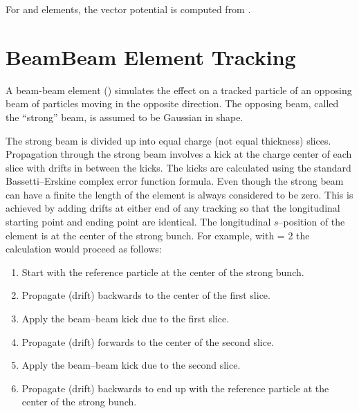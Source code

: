 For  and  elements, the vector potential is computed from
.

\section{BeamBeam Element Tracking}
\label{s:beambeam.std}

A beam-beam element () simulates the effect on a tracked
particle of an opposing beam of particles moving in the opposite
direction. The opposing beam, called the ``strong'' beam, is assumed
to be Gaussian in shape.

The strong beam is divided up into  equal charge (not
equal thickness) slices. Propagation through the strong beam involves
a kick at the charge center of each slice with drifts in between the
kicks. The kicks are calculated using the standard Bassetti--Erskine
complex error function formula\cite{b:talman}.  Even though the strong
beam can have a finite  the length of the element is always
considered to be zero. This is achieved by adding drifts at either end
of any tracking so that the longitudinal starting point and ending
point are identical. The longitudinal $s$--position of the
 element is at the center of the strong bunch. For
example, with  = 2 the calculation would proceed as
follows:
\begin{enumerate}
  \item  Start with the reference particle at the center of the strong bunch.
  \item  Propagate (drift) backwards to the center of the first slice.
  \item  Apply the beam--beam kick due to the first slice.
  \item  Propagate (drift) forwards to the center of the second slice.
  \item  Apply the beam--beam kick due to the second slice.
  \item  Propagate (drift) backwards to end up with the reference particle
     at the center of the strong bunch.
\end{enumerate}

